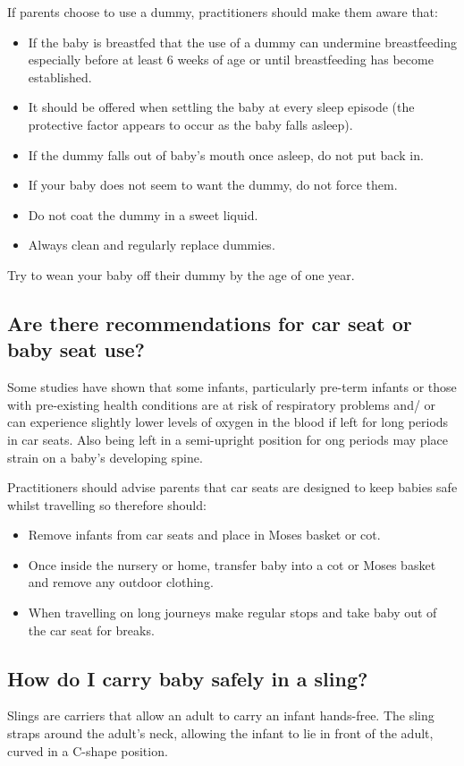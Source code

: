 If parents choose to use a dummy, practitioners should make them aware that:
\begin{itemize}
\item If the baby is breastfed that the use of a dummy can undermine breastfeeding especially before at least 6 weeks of age or until breastfeeding has become established.
\item It should be offered when settling the baby at every sleep episode (the protective factor appears to occur as the baby falls asleep).
\item If the dummy falls out of baby’s mouth once asleep, do not put back in.
\item If your baby does not seem to want the dummy, do not force them.
\item Do not coat the dummy in a sweet liquid.
\item Always clean and regularly replace dummies.
\end{itemize}

Try to wean your baby off their dummy by the age of one year.

\subsection{Are there recommendations for car seat or baby seat use?}
Some studies have shown that some infants, particularly pre-term infants or those with pre-existing 
health conditions are at risk of respiratory problems and/ or can experience slightly lower levels of
 oxygen in the blood if left for long periods in car seats. Also being left in a semi-upright position for 
ong periods may place strain on a baby’s developing spine.

Practitioners should advise parents that car seats are designed to keep babies safe whilst travelling 
so therefore should:

\begin{itemize}
\item Remove infants from car seats and place in Moses basket or cot.
\item Once inside the nursery or home, transfer baby into a cot or Moses basket and remove any outdoor clothing. 
\item When travelling on long journeys make regular stops and take baby out of the car seat for breaks. 
\end{itemize}


\subsection{How do I carry baby safely in a sling?}
Slings are carriers that allow an adult to carry an infant hands-free. The sling straps around
the adult’s neck, allowing the infant to lie in front of the adult, curved in a C-shape position.

